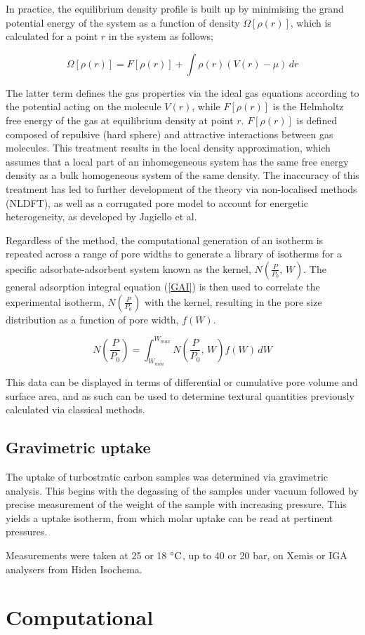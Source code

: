 In practice, the equilibrium density profile is built up by minimising the grand potential energy of the system as a function of density $\Omega[\rho(r)]$, which is calculated for a point $r$ in the system as follows;

\begin{equation}
\Omega[\rho(r)] = F[\rho(r)] + \int \rho(r)\left(V(r) - \mu\right) \,dr
\end{equation}

The latter term defines the gas properties via the ideal gas equations according to the potential acting on the molecule $V(r)$, while $F[\rho(r)]$ is the Helmholtz free energy of the gas at equilibrium density at point $r$. $F[\rho(r)]$ is defined composed of repulsive (hard sphere) and attractive interactions between gas molecules. This treatment results in the local density approximation, which assumes that a local part of an inhomegeneous system has the same free energy density as a bulk homogeneous system of the same density. The inaccuracy of this treatment has led to further development of the theory via non-localised methods (NLDFT),  \citep{tarazona1987phase, lastoskie1993pore, landers2013density} 
as well as a corrugated pore model to account for energetic heterogeneity, as developed by Jagiello et al.\citep{Jagiello20132D}

Regardless of the method, the computational generation of an isotherm is repeated across a range of pore widths to generate a library of isotherms for a specific adsorbate-adsorbent system known as the kernel, $N\left(\frac{P}{P_0}, \, W\right)$. The general adsorption integral equation (\ref{GAI}) is then used to correlate the experimental isotherm, $N\left(\frac{P}{P_0}\right)$  with the kernel, resulting in the pore size distribution as a function of pore width, $f(W)$.\citep{Thommes2015Physisorption}

\begin{equation} \label{eq:GAI}
    N\left(\frac{P}{P_0}\right) = \int_{W_{min}}^{W_{max}} N\left(\frac{P}{P_0}, \, W \right) f(W) \, dW
\end{equation}

This data can be displayed in terms of differential or cumulative pore volume and surface area, and as such can be used to determine textural quantities previously calculated via classical methods.

\subsection{Gravimetric  uptake}
The  uptake of turbostratic carbon samples was determined via gravimetric analysis. This begins with the degassing of the samples under vacuum followed by precise measurement of the weight of the sample with increasing  pressure. This yields a  uptake isotherm, from which molar uptake can be read at pertinent pressures.

Measurements were taken at 25 or 18 $\rm ^{\circ}C$, up to 40 or 20 bar, on Xemis or IGA analysers from Hiden Isochema. 

\section{Computational}



